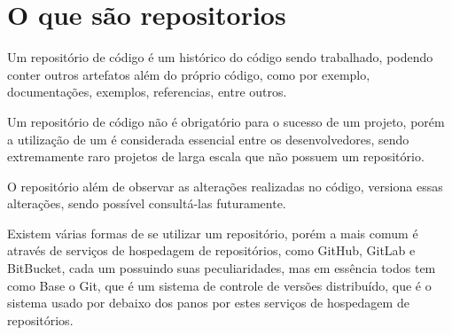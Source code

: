\section{O que são repositorios}

Um repositório de código é um histórico do código sendo trabalhado, podendo conter outros artefatos além do próprio código, como por exemplo, documentações, exemplos, referencias, entre outros. 

Um repositório de código não é obrigatório para o sucesso de um projeto, porém a utilização de um é considerada essencial entre os desenvolvedores, sendo extremamente raro projetos de larga escala que não possuem um repositório. 

O repositório além de observar as alterações realizadas no código, versiona essas alterações, sendo possível consultá-las futuramente. 

Existem várias formas de se utilizar um repositório, porém a mais comum é através de serviços de hospedagem de repositórios, como GitHub, GitLab e BitBucket, cada um possuindo suas peculiaridades, mas em essência todos tem como Base o Git, que é um sistema de controle de versões distribuído, que é o sistema usado por debaixo dos panos por estes serviços de hospedagem de repositórios.  